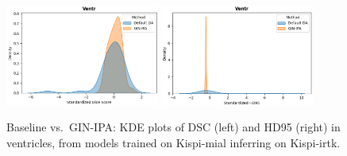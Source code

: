 \begin{figure}[htbp]
  \centering
  \includegraphics[width=0.45\textwidth]{figures/1_mial-irtk_DC_Ventr.png}\quad
  \includegraphics[width=0.45\textwidth]{figures/1_mial-irtk_HD_Ventr.png}
  \caption{Baseline vs.\ GIN-IPA: KDE plots of DSC (left) and HD95 (right) in ventricles, from models trained on Kispi-mial inferring on Kispi-irtk.}
  \label{fig:1_mial_irtk_ventr}
\end{figure}


